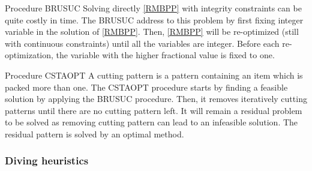 \begin{paragraph}{Procedure BRUSUC}
	Solving directly \eqref{RMBPP} with integrity constraints can be quite costly in time. The BRUSUC address to this problem by first fixing integer variable in the solution of \eqref{RMBPP}. Then, \eqref{RMBPP} will be re-optimized (still with continuous constraints) until all the variables are integer. Before each re-optimization, the variable with the higher fractional value is fixed to one.
\end{paragraph}

\begin{paragraph}{Procedure CSTAOPT}
	A cutting pattern is a pattern containing an item which is packed more than one. The CSTAOPT procedure starts by finding a feasible solution by applying the BRUSUC procedure. Then, it removes iteratively cutting patterns until there are no cutting pattern left. It will remain a residual problem to be solved as removing cutting pattern can lead to an infeasible solution. The residual pattern is solved by an optimal method.
\end{paragraph}

\subsubsection{Diving heuristics}


